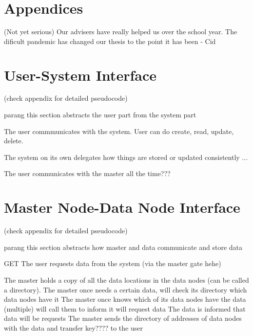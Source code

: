 \documentclass[acmsmall]{acmart}
\begin{document}
\section{Appendices}

\begin{acks}

(Not yet serious) Our advisers have really helped us over the school year. The dificult pandemic has changed our thesis to the point it has been - Cid
\end{acks}




\appendix

\section{User-System Interface}
(check appendix for detailed pseudocode)

parang this section abstracts the user part from the system part

The user commmunicates with the system. User can do create, read, update, delete.

The system on its own delegates how things are stored or updated consistently ...

The user communicates with the master all the time???


\section{Master Node-Data Node Interface}
(check appendix for detailed pseudocode)

parang this section abstracts how master and data communicate and store data

GET
The user requests data from the system (via the master gate hehe)

The master holds a copy of all the data locations in the data nodes (can be called a directory). 
The master once needs a certain data, will check its directory which data nodes have it
The master once knows which of its data nodes have the data (multiple) will call them to inform it will request data
The data is informed that data will be requests
The master sends the directory of addresses of data nodes with the data and transfer key???? to the user
\end{document}
